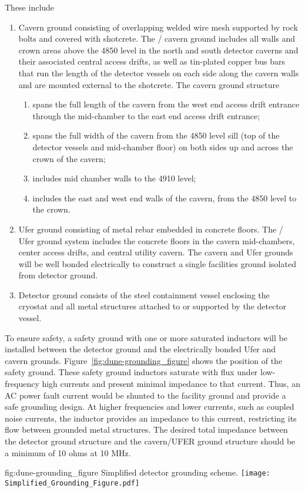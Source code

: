 These include
\begin{enumerate}
 \item Cavern ground consisting of overlapping welded wire mesh
   supported by rock bolts and covered with shotcrete. The
   / cavern ground includes all walls and
   crown areas above the 4850 level in the north and south detector
   caverns and their associated central access drifts, as well as tin-plated
   copper bus bars that run the length of the detector vessels
   on each side along the cavern walls and are mounted external to the
   shotcrete.  The cavern ground structure
\begin{enumerate}
 \item spans the full length of the cavern from the west end access
   drift entrance through the mid-chamber to the east end access drift
   entrance;
 \item spans the full width of the cavern from the 4850 level sill
   (top of the detector vessels and mid-chamber floor) on both sides
   up and across the crown of the cavern;
 \item includes mid chamber walls to the 4910 level;
 \item includes the east and west end walls of the cavern, from the
   4850 level to the crown.
\end{enumerate}
 \item Ufer ground consisting of metal rebar embedded in concrete floors. The / Ufer ground system
   includes the concrete floors in the cavern mid-chambers, center
   access drifts, and central utility cavern. The cavern and Ufer
   grounds will be well bonded electrically to construct a single
   facilities ground isolated from detector ground.
 \item Detector ground consists of the steel containment vessel
   enclosing the cryostat and all metal structures attached to or
   supported by the detector vessel.
\end{enumerate}


To ensure safety, a safety ground with one or more
saturated inductors will be installed between the detector ground
and the electrically bonded Ufer and cavern grounds.
Figure~\ref{fig:dune-grounding_figure} shows the position of the safety ground. These safety ground inductors saturate with flux
under low-frequency high currents and present minimal impedance to
that current.  Thus, an AC power fault current would be shunted to the
facility ground and provide a safe grounding design. At higher
frequencies and lower currents, such as coupled noise currents, the
inductor provides an impedance to this current, restricting its
flow between grounded metal structures. The desired total impedance
between the detector ground structure and the cavern/UFER ground
structure should be a minimum of 10 ohms at 10 MHz.
\begin{dunefigure}{fig:dune-grounding_figure}
  {Simplified detector grounding scheme.}
  \texttt{[image: Simplified\_Grounding\_Figure.pdf]}
\end{dunefigure}


